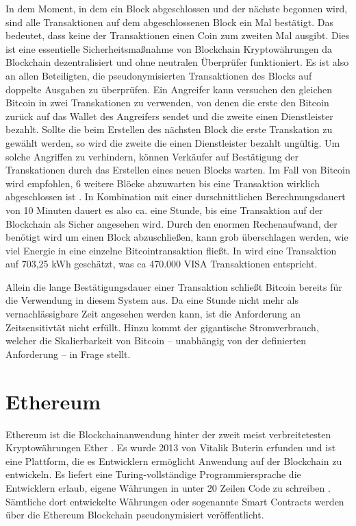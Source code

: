 \documentclass[
	fontsize=11pt,
	headings=small,
	parskip=half,           %
	bibliography=totoc,
	numbers=noenddot,       %
	open=any,               %
]{scrreprt}
\begin{document}
In dem Moment, in dem ein Block abgeschlossen und der nächste begonnen wird, sind alle Transaktionen auf dem abgeschlossenen Block ein Mal bestätigt. Das bedeutet, dass keine der Transaktionen einen Coin zum zweiten Mal ausgibt. Dies ist eine essentielle Sicherheitsmaßnahme von Blockchain Kryptowährungen da Blockchain dezentralisiert und ohne neutralen Überprüfer funktioniert. Es ist also an allen Beteiligten, die pseudonymisierten Transaktionen des Blocks auf doppelte Ausgaben zu überprüfen. Ein Angreifer kann versuchen den gleichen Bitcoin in zwei Transkationen zu verwenden, von denen die erste den Bitcoin zurück auf das Wallet des Angreifers sendet und die zweite einen Dienstleister bezahlt. Sollte die beim Erstellen des nächsten Block die erste Transkation zu gewählt werden, so wird die zweite die einen Dienstleister bezahlt ungültig. Um solche Angriffen zu verhindern, können Verkäufer auf Bestätigung der Transkationen durch das Erstellen eines neuen Blocks warten. Im Fall von Bitcoin wird empfohlen, 6 weitere Blöcke abzuwarten bis eine Transaktion wirklich abgeschlossen ist \cite{btc-Zaghloul2019Bitcoin}. In Kombination mit einer durschnittlichen Berechnungsdauert von 10 Minuten dauert es also ca. eine Stunde, bis eine Transaktion auf der Blockchain als Sicher angesehen wird.
Durch den enormen Rechenaufwand, der benötigt wird um einen Block abzuschließen, kann grob überschlagen werden, wie viel Energie in eine einzelne Bitcointransaktion fließt. In \cite{btc-energyConsumption} wird eine Transaktion auf 703,25 kWh geschätzt, was ca 470.000 VISA Transaktionen entspricht.

Allein die lange Bestätigungsdauer einer Transaktion schließt Bitcoin bereits für die Verwendung in diesem System aus. Da eine Stunde nicht mehr als vernachlässigbare Zeit angesehen werden kann, ist die Anforderung an Zeitsensitivtät nicht erfüllt. Hinzu kommt der gigantische Stromverbrauch, welcher die Skalierbarkeit von Bitcoin -- unabhängig von der definierten Anforderung -- in Frage stellt. 

\section{Ethereum}
\label{sec:ethereum}
Ethereum ist die Blockchainanwendung hinter der zweit meist verbreitetesten Kryptowährungen Ether \cite{eth-marketCapitalisation}. Es wurde 2013 von Vitalik Buterin erfunden und ist eine Plattform, die es Entwicklern ermöglicht Anwendung auf der Blockchain zu entwickeln. Es liefert eine Turing-vollständige Programmiersprache die Entwicklern erlaub, eigene Währungen in unter 20 Zeilen Code zu schreiben \cite{eth-buterin2013ethereum}. Sämtliche dort entwickelte Währungen oder sogenannte Smart Contracts werden über die Ethereum Blockchain pseudonymisiert veröffentlicht. 
\end{document}
